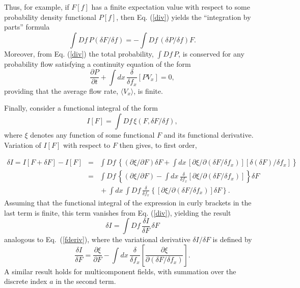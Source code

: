 \documentclass[a4paper,preprint, showpacs, aps, draft]{revtex4}
\begin{document}
{{Thus, for example, if $F[f]$ has a finite expectation value
with respect to some probability density functional $P[f]$, then 
Eq. (\ref{div}) yields the ``integration by parts'' formula
\[
\int D\!f\,P (\delta F/\delta f) = -\int D\!f\, (\delta P/\delta f)F .\]
Moreover, from Eq. (\ref{div}) the total probability,
$\int D\!f\, P$,
is conserved for any probability flow satisfying a continuity equation of
the form
\begin{equation} \label{gcont}
\frac{\partial P}{\partial t} + \int dx\, \frac{\delta}{\delta f_x} \left[ 
PV_x\right] = 0 ,
\end{equation}
providing that the average flow rate, $\langle V_x\rangle$, is finite. 

Finally, consider a functional integral of the form
\begin{equation} \label{mdensity}
I[F] = \int D\!f\,\xi(F, \delta F/\delta f) ,
\end{equation}
where $\xi$ denotes any function of some functional $F$ and its functional
derivative.  Variation of $I[F]$ with respect to $F$ then gives, to
first order,

\begin{eqnarray*}
\delta I = I[F+\delta F]-I[F] & = & \int D\!f \,\left\{
(\partial \xi/\partial F)\delta F +\int dx\, \left[
\partial \xi/\partial (\delta F/\delta f_x)\right]\left[\delta
(\delta F)/\delta f_x\right]\right\}\\
& = & \int D\!f\, \left\{(\partial \xi/\partial F) - \int dx\,
\frac{\delta}{\delta f_x} \left[ \partial \xi/\partial (\delta
F/\delta f_x)\right]\right\}\delta F\\
& & \mbox{} + \int dx\,\int D\!f\, \frac{\delta}{\delta f_x} \left\{
\left[ \partial \xi/\partial (\delta F/\delta f_x)\right]\delta F
\right\} .
\end{eqnarray*}
Assuming that the functional integral of the expression in curly
brackets in the last term is finite, this term vanishes from Eq.
(\ref{div}), yielding  the result
\[ \delta I = \int D\!f\, \frac{\delta I}{\delta F}\, \delta F \]
analogous to Eq.~(\ref{fderiv}), where the variational derivative
$\delta I/\delta F$ is defined by
\begin{equation} \label{mform}
\frac{\delta I}{\delta F} = \frac{\partial \xi}{\partial F}
- \int dx\,\frac{\delta}{\delta f_x}\left[\frac{\partial \xi}{
\partial (\delta F/\delta f_x)}\right] .
\end{equation}
A similar result holds for multicomponent fields, with summation over
the discrete index $a$ in the second term.

}}
\end{document}
